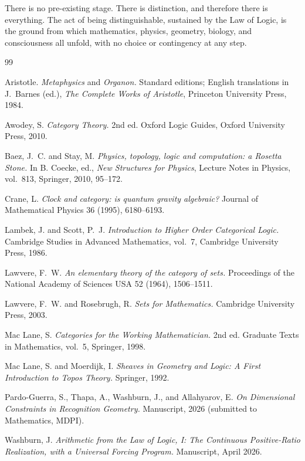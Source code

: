 \documentclass[11pt,a4paper]{article}
\theoremstyle{definition}
\theoremstyle{remark}
\begin{document}
There is no pre-existing stage. There is distinction, and therefore there is everything. The act of being distinguishable, sustained by the Law of Logic, is the ground from which mathematics, physics, geometry, biology, and consciousness all unfold, with no choice or contingency at any step.

\begin{thebibliography}{99}

Aristotle.
\emph{Metaphysics} and \emph{Organon.}
Standard editions; English translations in J.~Barnes (ed.),
\emph{The Complete Works of Aristotle}, Princeton University Press,
1984.

Awodey, S.
\emph{Category Theory.} 2nd ed.
Oxford Logic Guides, Oxford University Press, 2010.

Baez, J.~C. and Stay, M.
\emph{Physics, topology, logic and computation: a Rosetta Stone.}
In B. Coecke, ed., \emph{New Structures for Physics}, Lecture
Notes in Physics, vol.~813, Springer, 2010, 95--172.

Crane, L.
\emph{Clock and category: is quantum gravity algebraic?}
Journal of Mathematical Physics 36 (1995), 6180--6193.

Lambek, J. and Scott, P.~J.
\emph{Introduction to Higher Order Categorical Logic.}
Cambridge Studies in Advanced Mathematics, vol.~7, Cambridge
University Press, 1986.

Lawvere, F.~W.
\emph{An elementary theory of the category of sets.}
Proceedings of the National Academy of Sciences USA 52 (1964),
1506--1511.

Lawvere, F.~W. and Rosebrugh, R.
\emph{Sets for Mathematics.}
Cambridge University Press, 2003.

Mac Lane, S.
\emph{Categories for the Working Mathematician.} 2nd ed.
Graduate Texts in Mathematics, vol.~5, Springer, 1998.

Mac Lane, S. and Moerdijk, I.
\emph{Sheaves in Geometry and Logic: A First Introduction to Topos
Theory.}
Springer, 1992.

Pardo-Guerra, S., Thapa, A., Washburn, J., and Allahyarov, E.
\emph{On Dimensional Constraints in Recognition Geometry.}
Manuscript, 2026 (submitted to Mathematics, MDPI).

Washburn, J.
\emph{Arithmetic from the Law of Logic, I: The Continuous Positive-Ratio
Realization, with a Universal Forcing Program.}
Manuscript, April 2026.


\end{thebibliography}
\end{document}
